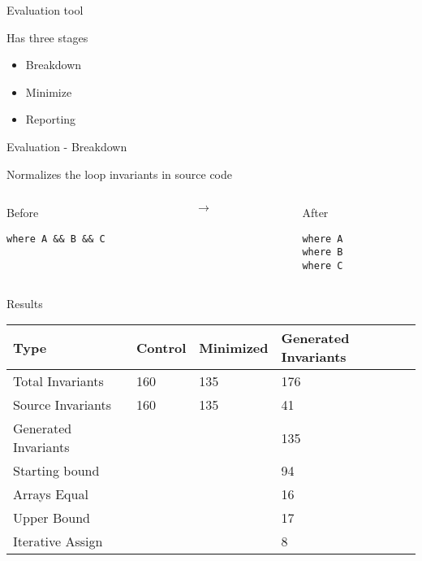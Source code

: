 \begin{frame}{Evaluation tool}

Has three stages

\begin{itemize}
\tightlist
\item
  Breakdown
\item
  Minimize
\item
  Reporting
\end{itemize}

\end{frame}

\begin{frame}[fragile]{Evaluation - Breakdown}

Normalizes the loop invariants in source code

\begin{columns}
\begin{column}{0.4\textwidth}
\begin{block}{Before}
\begin{verbatim}
where A && B && C
\end{verbatim}
\end{block}
\end{column}
\begin{column}{0.1\textwidth}
$\rightarrow$
\end{column}
\begin{column}{0.4\textwidth}
\begin{block}{After}
\begin{verbatim}
where A
where B
where C
\end{verbatim}
\end{block}
\end{column}
\end{columns}

\end{frame}

\begin{frame}{Results}

\begin{longtable}[]{@{}llll@{}}
\toprule
Type & Control & Minimized & Generated Invariants\tabularnewline
\midrule
\endhead
Total Invariants & 160 & 135 & 176\tabularnewline
Source Invariants & 160 & 135 & 41\tabularnewline
Generated Invariants & & & 135\tabularnewline
Starting bound & & & 94\tabularnewline
Arrays Equal & & & 16\tabularnewline
Upper Bound & & & 17\tabularnewline
Iterative Assign & & & 8\tabularnewline
\bottomrule
\end{longtable}

\end{frame}

